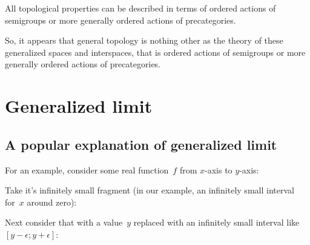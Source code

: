 \documentclass{amsart}
\begin{document}
All topological properties can be described in terms of
ordered actions of semigroups or more generally ordered actions of precategories.

So, it appears that general topology is nothing other as the
theory of these generalized spaces and interspaces, that is
ordered actions of semigroups or more generally ordered actions of precategories.

\section{Generalized limit}

\subsection{A popular explanation of generalized limit}

For an example, consider some real function~$f$ from $x$-axis to $y$-axis:
\begin{figure}[H]
\end{figure}
 
Take it's infinitely small fragment (in our example, an infinitely small interval for~$x$ around zero):
\begin{figure}[H]
\end{figure}

Next consider that with a value~$y$ replaced with an infinitely small interval like $[y-\epsilon;y+\epsilon]$:
\begin{figure}[H]
\end{figure}
\end{document}
